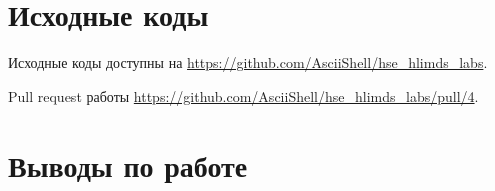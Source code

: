 \documentclass[a4paper,14pt]{article}
\begin{document}
    \section{Исходные коды}

    Исходные коды доступны на \href{https://github.com/AsciiShell/hse_hlimds_labs}
    {https://github.com/AsciiShell/hse\_hlimds\_labs}.

    Pull request работы \href{https://github.com/AsciiShell/hse_hlimds_labs/pull/4}
    {https://github.com/AsciiShell/hse\_hlimds\_labs/pull/4}.


    \section{Выводы по работе}
\end{document}
